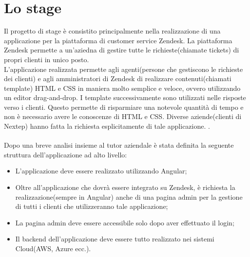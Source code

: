 \section{Lo stage}
Il progetto di stage è consistito principalmente nella realizzazione di una applicazione per la piattaforma di customer service Zendesk. La piattaforma Zendesk permette a un'aziedna di gestire tutte le richieste(chiamate tickets) di propri clienti in unico posto. \\ L'applicazione realizzata permette agli agenti(persone che gestiscono le richieste dei clienti) e agli amministratori di Zendesk di realizzare contenuti(chiamati template) HTML e CSS in maniera molto semplice e veloce, ovvero utilizzando un editor drag-and-drop. I template successivamente sono utilizzati nelle risposte verso i clienti. Questo permette di risparmiare una notevole quantità di tempo e non è necessario avere le conoscenze di HTML e CSS. Diverse aziende(clienti di Nextep) hanno fatta la richiesta esplicitamente di tale applicazione. .
\\
\\
Dopo una breve analisi insieme al tutor aziendale è stata definita la seguente struttura dell'applicazione ad alto livello: 
\begin{itemize}
	\item L'applicazione deve essere realizzato utilizzando Angular; 
	\item Oltre all'applicazione che dovrà essere integrato su Zendesk, è richiesta la realizzazione(sempre in Angular) anche di una pagina admin per la gestione di tutti i clienti che utilizzeranno tale applicazione;
	\item La pagina admin deve essere accessibile solo dopo aver effettuato il login;
	\item Il backend dell'applicazione deve essere tutto realizzato nei sistemi Cloud(AWS, Azure ecc.).
\end{itemize} 